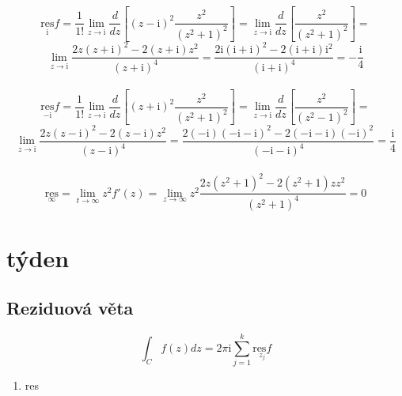 \documentclass{article}
\newcommand{\mi}{\mathrm{i}}
\newcommand{\res}{\mathrm{res}}
\begin{document}
        \[\underset{\mi}{\res}f=\frac{1}{1!}\lim_{z\to\mi}\frac{d}{dz}
        \left[(z-\mi)^2\frac{z^2}{(z^2+1)^2}\right]=\lim_{z\to\mi}\frac{d}{dz}
        \left[\frac{z^2}{(z^2+1)^2}\right]=\]
        \[\lim_{z\to\mi}\frac{2z(z+\mi)^2-2(z+\mi)z^2}{(z+\mi)^4}=
        \frac{2\mi(\mi+\mi)^2-2(\mi+\mi)\mi^2}{(\mi+\mi)^4}=-\frac{\mi}{4}\]
        \\
        \[\underset{-\mi}{\res}f=\frac{1}{1!}\lim_{z\to\mi}\frac{d}{dz}
        \left[(z+\mi)^2\frac{z^2}{(z^2+1)^2}\right]=\lim_{z\to\mi}\frac{d}{dz}
        \left[\frac{z^2}{(z^2-1)^2}\right]=\]
        \[\lim_{z\to\mi}\frac{2z(z-\mi)^2-2(z-\mi)z^2}{(z-\mi)^4}=
        \frac{2(-\mi)(-\mi-\mi)^2-2(-\mi-\mi)(-\mi)^2}{(-\mi-\mi)^4}=\frac{\mi}{4}\]
        \\
        \[\underset{\infty}{\res}=\lim_{t\to\infty}z^2f'(z)=
        \lim_{z\to\infty}z^2\frac{2z(z^2+1)^2-2(z^2+1)zz^2}{(z^2+1)^4}=0\]
    \section{týden}%
    \subsection{Reziduová věta}
        \[\int_Cf(z)dz=2\pi\mi\sum_{j=1}^{k}\underset{z_j}{\res f}\]
        \begin{enumerate}
            \item res
        \end{enumerate}
\end{document}
